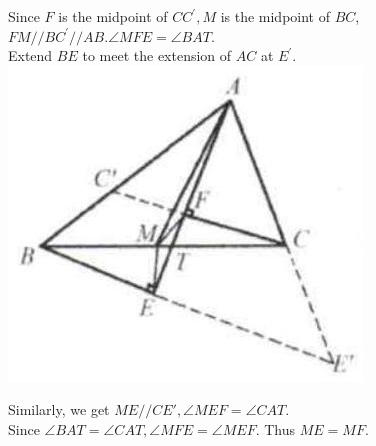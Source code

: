 \documentclass[10pt]{article}
\begin{document}
Since \(F\) is the midpoint of \(C C^{\prime}, M\) is the midpoint of \(B C\), \(F M / / B C^{\prime} / / A B . \angle M F E=\angle B A T\).\\
Extend \(B E\) to meet the extension of \(A C\) at \(E^{\prime}\).\\
\includegraphics[max width=\textwidth, center]{2025_04_17_97bc1f7e44d93c271a88g-068(1)}


Similarly, we get \(M E / / C E \prime, \angle M E F=\angle C A T\).\\
Since \(\angle B A T=\angle C A T, \angle M F E=\angle M E F\). Thus \(M E=M F\).
\end{document}

